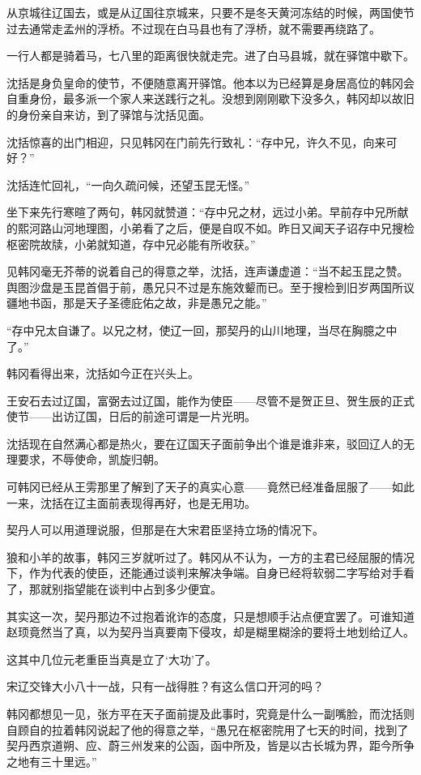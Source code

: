 从京城往辽国去，或是从辽国往京城来，只要不是冬天黄河冻结的时候，两国使节过去通常走孟州的浮桥。不过现在白马县也有了浮桥，就不需要再绕路了。

一行人都是骑着马，七八里的距离很快就走完。进了白马县城，就在驿馆中歇下。

沈括是身负皇命的使节，不便随意离开驿馆。他本以为已经算是身居高位的韩冈会自重身份，最多派一个家人来送践行之礼。没想到刚刚歇下没多久，韩冈却以故旧的身份亲自来访，到了驿馆与沈括见面。

沈括惊喜的出门相迎，只见韩冈在门前先行致礼：“存中兄，许久不见，向来可好？”

沈括连忙回礼，“一向久疏问候，还望玉昆无怪。”

坐下来先行寒暄了两句，韩冈就赞道：“存中兄之材，远过小弟。早前存中兄所献的熙河路山河地理图，小弟看了之后，便是自叹不如。昨日又闻天子诏存中兄搜检枢密院故牍，小弟就知道，存中兄必能有所收获。”

见韩冈毫无芥蒂的说着自己的得意之举，沈括，连声谦虚道：“当不起玉昆之赞。舆图沙盘是玉昆首倡于前，愚兄只不过是东施效颦而已。至于搜检到旧岁两国所议疆地书函，那是天子圣德庇佑之故，非是愚兄之能。”

“存中兄太自谦了。以兄之材，使辽一回，那契丹的山川地理，当尽在胸臆之中了。”

韩冈看得出来，沈括如今正在兴头上。

王安石去过辽国，富弼去过辽国，能作为使臣——尽管不是贺正旦、贺生辰的正式使节——出访辽国，日后的前途可谓是一片光明。

沈括现在自然满心都是热火，要在辽国天子面前争出个谁是谁非来，驳回辽人的无理要求，不辱使命，凯旋归朝。

可韩冈已经从王雱那里了解到了天子的真实心意——竟然已经准备屈服了——如此一来，沈括在辽主面前表现得再好，也是无用功。

契丹人可以用道理说服，但那是在大宋君臣坚持立场的情况下。

狼和小羊的故事，韩冈三岁就听过了。韩冈从不认为，一方的主君已经屈服的情况下，作为代表的使臣，还能通过谈判来解决争端。自身已经将软弱二字写给对手看了，那就别指望能在谈判中占到多少便宜。

其实这一次，契丹那边不过抱着讹诈的态度，只是想顺手沾点便宜罢了。可谁知道赵顼竟然当了真，以为契丹当真要南下侵攻，却是糊里糊涂的要将土地划给辽人。

这其中几位元老重臣当真是立了‘大功’了。

宋辽交锋大小八十一战，只有一战得胜？有这么信口开河的吗？

韩冈都想见一见，张方平在天子面前提及此事时，究竟是什么一副嘴脸，而沈括则自顾自的拉着韩冈说起了他的得意之举，“愚兄在枢密院用了七天的时间，找到了契丹西京道朔、应、蔚三州发来的公函，函中所及，皆是以古长城为界，距今所争之地有三十里远。”

